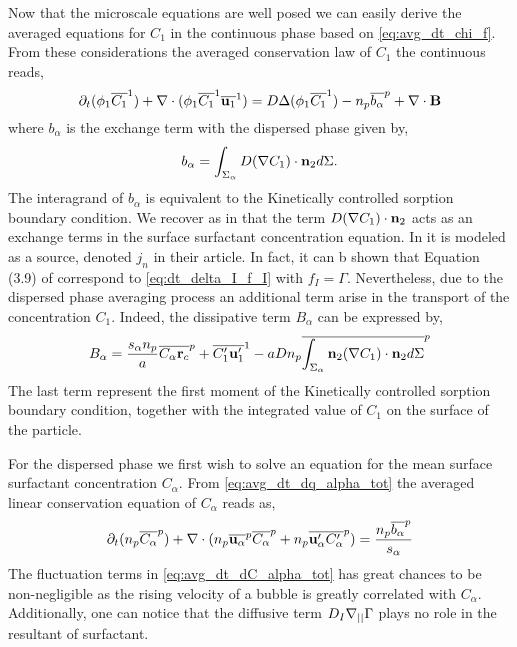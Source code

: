 Now that the microscale equations are well posed we can easily derive the averaged equations for $C_1$ in the continuous phase based on \ref{eq:avg_dt_chi_f}. 
From these considerations the averaged conservation law of $C_1$ the continuous reads, 
\begin{equation}
    \partial_t (\phi_1 \overline{C_1}^1)
    + \mathbf{\nabla} \cdot (\phi_1 \overline{C_1}^1 \overline{\textbf{u}_1}^1)
    = D \Delta (\phi_1\overline{C_1}^1) 
    - n_p\overline{b_\alpha}^{p}
    +  \mathbf{\nabla} \cdot \textbf{B}
    \label{eq:hybrid_avg_dt_C}
\end{equation}
where $b_\alpha$ is the exchange term with the dispersed phase given by, 
\begin{equation*}
    b_\alpha
    = \int_{\Sigma_\alpha}
    D(\mathbf{\nabla} C_1 ) 
\cdot \textbf{n}_2d\Sigma.
\end{equation*}
The interagrand of $b_\alpha$ is equivalent to the Kinetically controlled sorption boundary condition\citet{pesci2018computational}. 
We recover as in \citet{manikantan2020surfactant} that the term $D(\mathbf{\nabla} C_1) \cdot \textbf{n}_2$ acts as an exchange terms in the surface surfactant concentration equation. 
In \citet{manikantan2020surfactant} it is modeled as a source, denoted $j_n$ in their article.
In fact, it can b shown that Equation (3.9) of \citet{manikantan2020surfactant} correspond to \ref{eq:dt_delta_I_f_I} with $f_I = \Gamma$. 
Nevertheless, due to the dispersed phase averaging process an additional term arise in the transport of the concentration $C_1$. 
Indeed, the dissipative term $B_\alpha$ can be expressed by, 
\begin{equation*}
    B_\alpha
    =     
    \frac{s_\alpha n_p}{a}\overline{C_\alpha\textbf{r}_c}^{p}
    + \overline{C'_1\textbf{u}_1'}^1
    - aDn_p\overline{\int_{\Sigma_\alpha} \textbf{n}_2
    (\mathbf{\nabla} C_1)
\cdot \textbf{n}_2d\Sigma}^{p}
\end{equation*}
The last term represent the first moment of the Kinetically controlled sorption boundary condition, together with the integrated value of $C_1$ on the surface of the particle. 


For the dispersed phase we first wish to solve an equation for the mean surface surfactant concentration $C_\alpha$. 
From \ref{eq:avg_dt_dq_alpha_tot} the averaged linear conservation equation of $C_\alpha$ reads as, 
\begin{equation}
    \partial_t (n_p\overline{C_\alpha}^{p})
    + \mathbf{\nabla} \cdot (n_p\overline{\textbf{u}_\alpha}^{p} \overline{C_\alpha}^{p} + n_p\overline{\textbf{u}_\alpha' C'_\alpha}^{p})
    = 
    \frac{n_p\overline{b_\alpha}^{p}}{s_\alpha}
    \label{eq:avg_dt_dC_alpha_tot}
\end{equation}
The fluctuation terms in \ref{eq:avg_dt_dC_alpha_tot} has great chances to be non-negligible as the rising velocity of a bubble is greatly correlated with $C_\alpha$. 
Additionally, one can notice that the diffusive term $D_I \mathbf{\nabla}_{||} \Gamma$ plays no role in the resultant of surfactant. 

